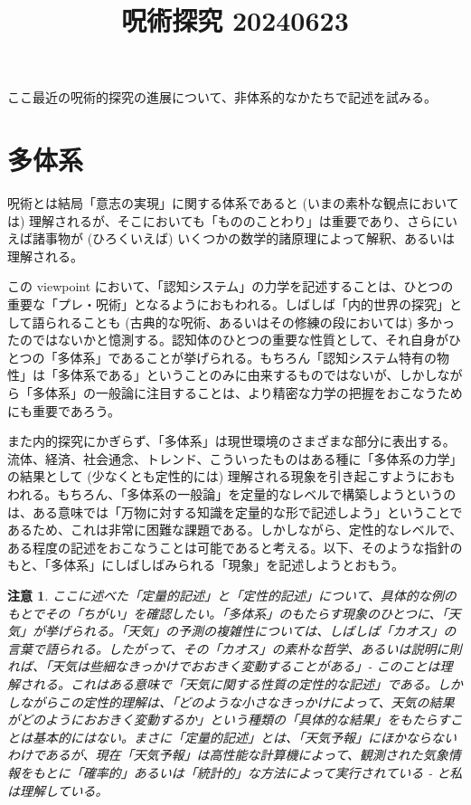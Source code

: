 \documentclass{jsarticle}
\title{呪術探究 20240623}
\author{}
\date{}
\theoremstyle{break}
\newtheorem{note}[thm]{注意}
\begin{document}
\maketitle

ここ最近の呪術的探究の進展について、非体系的なかたちで記述を試みる。

\section{多体系}

呪術とは結局「意志の実現」に関する体系であると (いまの素朴な観点においては) 理解されるが、そこにおいても「もののことわり」は重要であり、さらにいえば諸事物が (ひろくいえば) いくつかの数学的諸原理によって解釈、あるいは理解される。

この viewpoint において、「認知システム」の力学を記述することは、ひとつの重要な「プレ・呪術」となるようにおもわれる。しばしば「内的世界の探究」として語られることも (古典的な呪術、あるいはその修練の段においては) 多かったのではないかと憶測する。認知体のひとつの重要な性質として、それ自身がひとつの「多体系」であることが挙げられる。もちろん「認知システム特有の物性」は「多体系である」ということのみに由来するものではないが、しかしながら「多体系」の一般論に注目することは、より精密な力学の把握をおこなうためにも重要であろう。

また内的探究にかぎらず、「多体系」は現世環境のさまざまな部分に表出する。流体、経済、社会通念、トレンド、こういったものはある種に「多体系の力学」の結果として (少なくとも定性的には) 理解される現象を引き起こすようにおもわれる。もちろん、「多体系の一般論」を定量的なレベルで構築しようというのは、ある意味では「万物に対する知識を定量的な形で記述しよう」ということであるため、これは非常に困難な課題である。しかしながら、定性的なレベルで、ある程度の記述をおこなうことは可能であると考える。以下、そのような指針のもと、「多体系」にしばしばみられる「現象」を記述しようとおもう。

\begin{note}
ここに述べた「定量的記述」と「定性的記述」について、具体的な例のもとでその「ちがい」を確認したい。「多体系」のもたらす現象のひとつに、「天気」が挙げられる。「天気」の予測の複雑性については、しばしば「カオス」の言葉で語られる。したがって、その「カオス」の素朴な哲学、あるいは説明に則れば、「天気は些細なきっかけでおおきく変動することがある」- このことは理解される。これはある意味で「天気に関する性質の定性的な記述」である。しかしながらこの定性的理解は、「どのような小さなきっかけによって、天気の結果がどのようにおおきく変動するか」という種類の「具体的な結果」をもたらすことは基本的にはない。まさに「定量的記述」とは、「天気予報」にほかならないわけであるが、現在「天気予報」は高性能な計算機によって、観測された気象情報をもとに「確率的」あるいは「統計的」な方法によって実行されている - と私は理解している。
\end{note}
\end{document}
